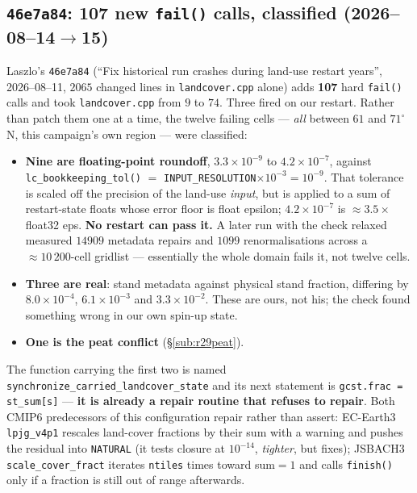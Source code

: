 \documentclass[10pt]{article}
\begin{document}
\subsection{\texttt{46e7a84}: 107 new \texttt{fail()} calls, classified
(2026--08--14$\to$15)}\label{sub:r29laszlo}
Laszlo's \texttt{46e7a84} (``Fix historical run crashes during land-use restart years'',
2026--08--11, $2065$ changed lines in \texttt{landcover.cpp} alone) adds \textbf{107} hard
\texttt{fail()} calls and took \texttt{landcover.cpp} from $9$ to $74$. Three fired on our
restart. Rather than patch them one at a time, the twelve failing cells --- \emph{all}
between $61$ and $71^\circ$N, this campaign's own region --- were classified:
\begin{itemize}\itemsep2pt
\item \textbf{Nine are floating-point roundoff}, $3.3\times10^{-9}$ to
$4.2\times10^{-7}$, against \texttt{lc\_bookkeeping\_tol()} $=$
\texttt{INPUT\_RESOLUTION}$\times10^{-3} = 10^{-9}$. That tolerance is scaled off the
precision of the land-use \emph{input}, but is applied to a sum of restart-state floats
whose error floor is float epsilon; $4.2\times10^{-7}$ is ${\approx}3.5\times$ float32
eps. \textbf{No restart can pass it.} A later run with the check relaxed measured
$14909$ metadata repairs and $1099$ renormalisations across a ${\approx}10\,200$-cell
gridlist --- essentially the whole domain fails it, not twelve cells.
\item \textbf{Three are real}: stand metadata against physical stand fraction, differing
by $8.0\times10^{-4}$, $6.1\times10^{-3}$ and $3.3\times10^{-2}$. These are ours, not his;
the check found something wrong in our own spin-up state.
\item \textbf{One is the peat conflict} (\S\ref{sub:r29peat}).
\end{itemize}
The function carrying the first two is named
\texttt{synchronize\_carried\_landcover\_state} and its next statement is
\texttt{gcst.frac = st\_sum[s]} --- \textbf{it is already a repair routine that refuses to
repair}. Both CMIP6 predecessors of this configuration repair rather than assert:
EC-Earth3 \texttt{lpjg\_v4p1} rescales land-cover fractions by their sum with a warning and
pushes the residual into \texttt{NATURAL} (it tests closure at $10^{-14}$, \emph{tighter},
but fixes); JSBACH3 \texttt{scale\_cover\_fract} iterates \texttt{ntiles} times toward
sum${=}1$ and calls \texttt{finish()} only if a fraction is still out of range afterwards.
\end{document}
